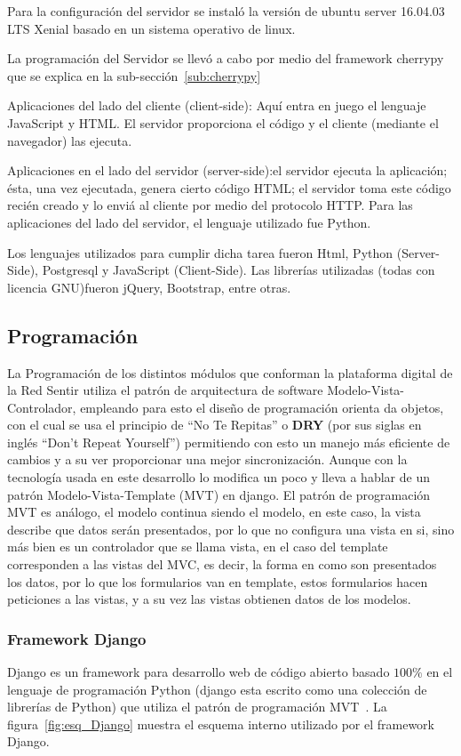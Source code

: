 \documentclass[a4paper]{article}
\begin{document}
Para la configuración del servidor se instaló la versión de ubuntu server 16.04.03 LTS Xenial basado en un sistema operativo de linux.

La programación del Servidor se llevó a cabo por medio del framework cherrypy que se explica en la sub-sección~\ref{sub:cherrypy}

Aplicaciones del lado del cliente (client-side): Aquí entra en juego el lenguaje JavaScript y HTML. El servidor proporciona el código y el cliente (mediante el navegador) las ejecuta. 

Aplicaciones en el lado del servidor (server-side):el servidor ejecuta la aplicación; ésta, una vez ejecutada, genera cierto código HTML; el servidor toma este código recién creado y lo enviá al cliente por medio del protocolo HTTP. Para las aplicaciones del lado del servidor, el lenguaje utilizado fue  Python.

Los lenguajes utilizados para cumplir dicha tarea fueron Html, Python (Server-Side), Postgresql y JavaScript (Client-Side). Las librerías utilizadas (todas con licencia GNU)fueron jQuery, Bootstrap, entre otras.

\subsection{Programación}
La Programación de los distintos módulos que conforman la plataforma digital de la Red Sentir utiliza el patrón de arquitectura de software Modelo-Vista-Controlador, empleando para esto el diseño de programación orienta da objetos, con el cual se usa el principio de ``No Te Repitas'' o \textbf{DRY} (por sus siglas en inglés ``Don't Repeat Yourself'') permitiendo con esto un manejo más eficiente de cambios y a su ver proporcionar una mejor sincronización. Aunque con la tecnología usada en este desarrollo lo modifica un poco y lleva a hablar de un patrón Modelo-Vista-Template (MVT) en django. El patrón de programación MVT es análogo, el modelo continua siendo el modelo, en este caso, la vista describe que datos serán presentados, por lo que no configura una vista en si, sino más bien es un controlador que se llama vista, en el caso del template corresponden a las vistas del MVC, es decir, la forma en como son presentados los datos, por lo que los formularios van en template, estos formularios hacen peticiones a las vistas, y a su vez las vistas obtienen datos de los modelos.

\subsubsection{Framework Django}
Django es un framework para desarrollo web de código abierto basado $100\%$ en el lenguaje de programación Python (django esta escrito como una colección de librerías de Python) que utiliza el patrón de programación MVT~\citep{Hol2009, DjangoM}. La figura~\ref{fig:esq_Django} muestra el esquema interno utilizado por el framework Django.
\end{document}
